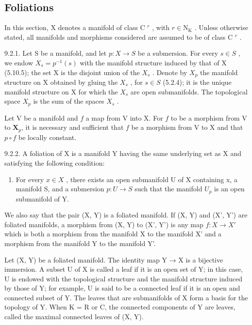 \subsection{Foliations}

In this section, X denotes a manifold of class C \(^{r}\) , with \(r \in \mathrm{N}_{\mathrm{K}}\) . Unless otherwise stated, all manifolds and morphisms considered are assumed to be of class C \(^{r}\) .

9.2.1. Let S be a manifold, and let \(p: X \to S\) be a submersion. For every \(s \in S\) , we endow \(X_s = p^{-1}(s)\) with the manifold structure induced by that of X (5.10.5); the set X is the disjoint union of the \(X_s\) . Denote by \(X_p\) the manifold structure on X obtained by gluing the \(X_s\) , for \(s \in S\) (5.2.4); it is the unique manifold structure on X for which the \(X_s\) are open submanifolds. The topological space \(X_p\) is the sum of the spaces \(X_s\) .

Let V be a manifold and \(f\) a map from V into X. For \(f\) to be a morphism from V to \(\mathbf{X}_{p}\), it is necessary and sufficient that \(f\) be a morphism from V to X and that \(p \circ f\) be locally constant.

9.2.2. A foliation of X is a manifold Y having the same underlying set as X and satisfying the following condition:

\begin{enumerate}
\def\labelenumi{(\Alph{enumi})}
\setcounter{enumi}{5}
\tightlist
\item
  For every \(x \in X\) , there exists an open submanifold U of X containing x, a manifold S, and a submersion \(p: U \to S\) such that the manifold \(U_{p}\) is an open submanifold of Y.
\end{enumerate}

We also say that the pair (X, Y) is a foliated manifold. If (X, Y) and (X', Y') are foliated manifolds, a morphism from (X, Y) to (X', Y') is any map \(f: X \to X'\) which is both a morphism from the manifold X to the manifold X' and a morphism from the manifold Y to the manifold Y'.

Let (X, Y) be a foliated manifold. The identity map Y → X is a bijective immersion. A subset U of X is called a leaf if it is an open set of Y; in this case, U is endowed with the topological structure and the manifold structure induced by those of Y; for example, U is said to be a connected leaf if it is an open and connected subset of Y. The leaves that are submanifolds of X form a basis for the topology of Y. When K = R or C, the connected components of Y are leaves, called the maximal connected leaves of (X, Y).

